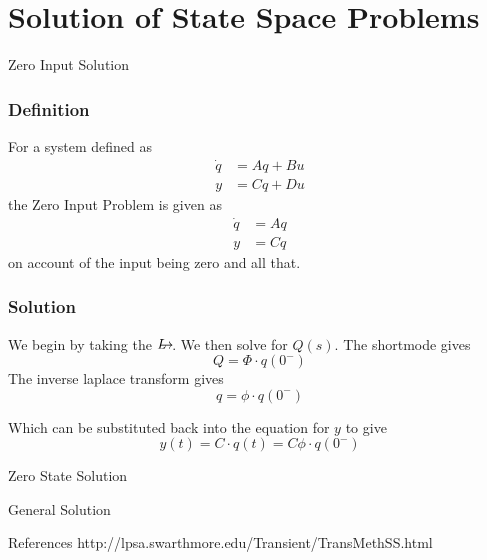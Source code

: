 \documentclass{../templates/topic}
\begin{document}
\chapter{Solution of State Space Problems}

\begin{section}{Zero Input Solution}
	
	\subsection{Definition}
	
		For a system defined as
		\begin{align}
			\dot{q}&=Aq+Bu \\
			y&= Cq+Du
		\end{align}
		the Zero Input Problem is given as
		\begin{align}
			\dot{q}&=Aq \\
			y&= Cq
		\end{align}
		on account of the input being zero and all that.
		
	\subsection{Solution}
		We begin by taking the $\laplace$.
		We then solve for $Q(s)$. The shortmode gives
		\begin{equation}
			Q=\Phi\cdot q(0^-)
		\end{equation}
		The inverse laplace transform gives
		\begin{equation}
			q=\phi\cdot q(0^-)
		\end{equation}
		
		Which can be substituted back into the equation for $y$ to give
		\begin{equation}
			y(t)=C\cdot q(t)=C\phi\cdot q(0^-)
		\end{equation}
	
\end{section}

\begin{section}{Zero State Solution}
	
\end{section}

\begin{section}{General Solution}
	
\end{section}

\begin{section}{References}
	http://lpsa.swarthmore.edu/Transient/TransMethSS.html
\end{section}
\end{document}
